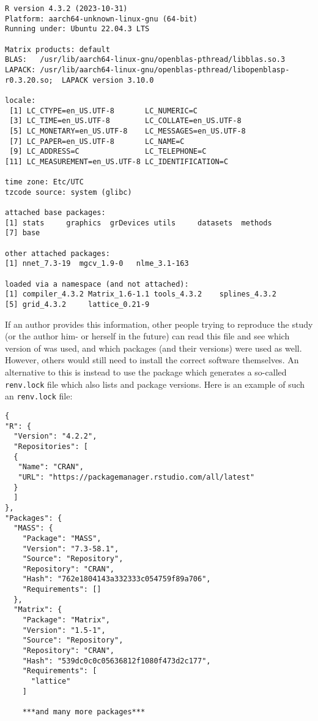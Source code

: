\documentclass[
  article]{jss}
\begin{document}
\begin{verbatim}
R version 4.3.2 (2023-10-31)
Platform: aarch64-unknown-linux-gnu (64-bit)
Running under: Ubuntu 22.04.3 LTS

Matrix products: default
BLAS:   /usr/lib/aarch64-linux-gnu/openblas-pthread/libblas.so.3 
LAPACK: /usr/lib/aarch64-linux-gnu/openblas-pthread/libopenblasp-r0.3.20.so;  LAPACK version 3.10.0

locale:
 [1] LC_CTYPE=en_US.UTF-8       LC_NUMERIC=C              
 [3] LC_TIME=en_US.UTF-8        LC_COLLATE=en_US.UTF-8    
 [5] LC_MONETARY=en_US.UTF-8    LC_MESSAGES=en_US.UTF-8   
 [7] LC_PAPER=en_US.UTF-8       LC_NAME=C                 
 [9] LC_ADDRESS=C               LC_TELEPHONE=C            
[11] LC_MEASUREMENT=en_US.UTF-8 LC_IDENTIFICATION=C       

time zone: Etc/UTC
tzcode source: system (glibc)

attached base packages:
[1] stats     graphics  grDevices utils     datasets  methods  
[7] base     

other attached packages:
[1] nnet_7.3-19  mgcv_1.9-0   nlme_3.1-163

loaded via a namespace (and not attached):
[1] compiler_4.3.2 Matrix_1.6-1.1 tools_4.3.2    splines_4.3.2 
[5] grid_4.3.2     lattice_0.21-9
\end{verbatim}

If an author provides this information, other people trying to reproduce
the study (or the author him- or herself in the future) can read this
file and see which version of  was used, and which packages
(and their versions) were used as well. However, others would still need
to install the correct software themselves. An alternative to this is
instead to use the  package which generates a so-called
\texttt{renv.lock} file which also lists  and package
versions. Here is an example of such an \texttt{renv.lock} file:

\begin{verbatim}
{
"R": {
  "Version": "4.2.2",
  "Repositories": [
  {
   "Name": "CRAN",
   "URL": "https://packagemanager.rstudio.com/all/latest"
  }
  ]
},
"Packages": {
  "MASS": {
    "Package": "MASS",
    "Version": "7.3-58.1",
    "Source": "Repository",
    "Repository": "CRAN",
    "Hash": "762e1804143a332333c054759f89a706",
    "Requirements": []
  },
  "Matrix": {
    "Package": "Matrix",
    "Version": "1.5-1",
    "Source": "Repository",
    "Repository": "CRAN",
    "Hash": "539dc0c0c05636812f1080f473d2c177",
    "Requirements": [
      "lattice"
    ]

    ***and many more packages***
\end{verbatim}
\end{document}
